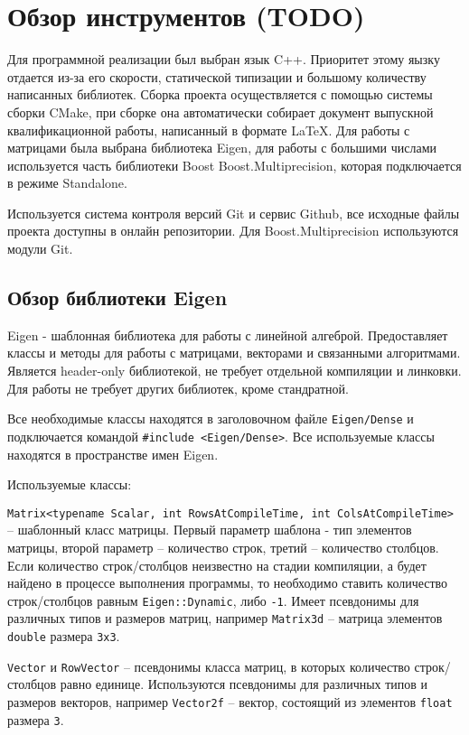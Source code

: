 \newpage

\section{Обзор инструментов (TODO)}

Для программной реализации был выбран язык C++. Приоритет этому яызку отдается из-за его скорости, статической типизации и большому количеству написанных библиотек. Сборка проекта осуществляется с помощью системы сборки CMake, при сборке она автоматически собирает документ выпускной квалификационной работы, написанный в формате \LaTeX. Для работы с матрицами была выбрана библиотека Eigen, для работы с большими числами используется часть библиотеки Boost Boost.Multiprecision, которая подключается в режиме Standalone.

Используется система контроля версий Git и сервис Github, все исходные файлы проекта доступны в онлайн репозитории. Для Boost.Multiprecision используются модули Git.

\subsection{Обзор библиотеки Eigen}

Eigen - шаблонная библиотека для работы с линейной алгеброй. Предоставляет классы и методы для работы с матрицами, векторами и связанными алгоритмами. Является header-only библиотекой, не требует отдельной компиляции и линковки. Для работы не требует других библиотек, кроме стандратной.

Все необходимые классы находятся в заголовочном файле \verb!Eigen/Dense! и подключается командой \verb!#include <Eigen/Dense>!. Все используемые классы находятся в пространстве имен Eigen.

Используемые классы:

\verb!Matrix<typename Scalar, int RowsAtCompileTime, int ColsAtCompileTime>! -- шаблонный класс матрицы. Первый параметр шаблона - тип элементов матрицы, второй параметр -- количество строк, третий -- количество столбцов. Если количество строк/столбцов неизвестно на стадии компиляции, а будет найдено в процессе выполнения программы, то необходимо ставить количество строк/столбцов равным \verb!Eigen::Dynamic!, либо \verb!-1!. Имеет псевдонимы для различных типов и размеров матриц, например \verb!Matrix3d! -- матрица элементов \verb!double! размера \verb!3x3!. 

\verb!Vector! и \verb!RowVector! -- псевдонимы класса матриц, в которых количество строк/столбцов равно единице. Используются псевдонимы для различных типов и размеров векторов, например \verb!Vector2f! -- вектор, состоящий из элементов \verb!float! размера \verb!3!.

